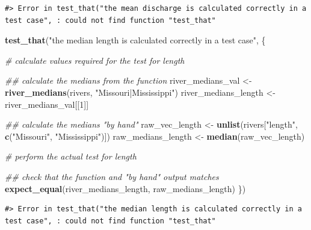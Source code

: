 \documentclass[
]{book}
\newenvironment{Shaded}{\begin{snugshade}}{\end{snugshade}}
\newcommand{\CommentTok}[1]{\textcolor[rgb]{0.56,0.35,0.01}{\textit{#1}}}
\newcommand{\DecValTok}[1]{\textcolor[rgb]{0.00,0.00,0.81}{#1}}
\newcommand{\KeywordTok}[1]{\textcolor[rgb]{0.13,0.29,0.53}{\textbf{#1}}}
\newcommand{\NormalTok}[1]{#1}
\newcommand{\StringTok}[1]{\textcolor[rgb]{0.31,0.60,0.02}{#1}}
\begin{document}
\begin{verbatim}
#> Error in test_that("the mean discharge is calculated correctly in a test case", : could not find function "test_that"
\end{verbatim}

\begin{Shaded}
\begin{Highlighting}[]
\KeywordTok{test_that}\NormalTok{(}\StringTok{"the median length is calculated correctly in a test case"}\NormalTok{, \{}
  
  \CommentTok{# calculate values required for the test for length}

  \CommentTok{## calculate the medians from the function}
\NormalTok{  river_medians_val <-}\StringTok{ }\KeywordTok{river_medians}\NormalTok{(rivers, }\StringTok{"Missouri|Mississippi"}\NormalTok{)}
\NormalTok{  river_medians_length <-}\StringTok{ }\NormalTok{river_medians_val[[}\DecValTok{1}\NormalTok{]]}

  \CommentTok{## calculate the medians "by hand"}
\NormalTok{  raw_vec_length <-}\StringTok{ }\KeywordTok{unlist}\NormalTok{(rivers[}\StringTok{"length"}\NormalTok{, }\KeywordTok{c}\NormalTok{(}\StringTok{"Missouri"}\NormalTok{, }\StringTok{"Mississippi"}\NormalTok{)])}
\NormalTok{  raw_medians_length <-}\StringTok{ }\KeywordTok{median}\NormalTok{(raw_vec_length)}
  
  \CommentTok{# perform the actual test for length}

  \CommentTok{## check that the function and "by hand" output matches}
  \KeywordTok{expect_equal}\NormalTok{(river_medians_length, raw_medians_length)}
\NormalTok{\})}
\end{Highlighting}
\end{Shaded}

\begin{verbatim}
#> Error in test_that("the median length is calculated correctly in a test case", : could not find function "test_that"
\end{verbatim}
\end{document}
